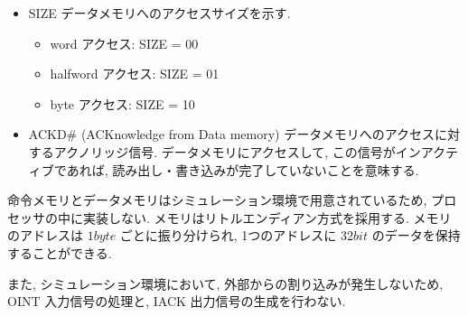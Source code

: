 \documentclass[../specifications.tex]{subfiles}
\begin{document}
\begin{itemize}
    \item SIZE
    \newline データメモリへのアクセスサイズを示す.
    \begin{itemize}
      \item word アクセス: SIZE = 00
      \item halfword アクセス: SIZE = 01
      \item byte アクセス: SIZE = 10
    \end{itemize}

    \item ACKD\# (ACKnowledge from Data memory)
    \newline データメモリへのアクセスに対するアクノリッジ信号.
    データメモリにアクセスして, この信号がインアクティブであれば, 
    読み出し・書き込みが完了していないことを意味する.

  \end{itemize}

  命令メモリとデータメモリはシミュレーション環境で用意されているため, 
  プロセッサの中に実装しない.
  メモリはリトルエンディアン方式を採用する.
  メモリのアドレスは $1byte$ ごとに振り分けられ, 
  1つのアドレスに $32bit$ のデータを保持することができる.

  また, シミュレーション環境において, 外部からの割り込みが発生しないため, 
  OINT 入力信号の処理と, IACK 出力信号の生成を行わない.
\end{document}

